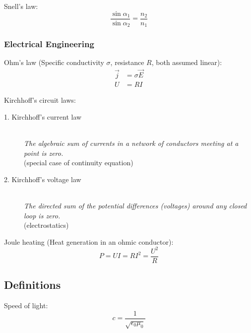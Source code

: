 			\noindent
			Snell's law:
			\begin{equation}
				\frac{\sin\alpha_1}{\sin\alpha_2} = \frac{n_2}{n_1}
			\end{equation}



		\subsubsection{Electrical Engineering}
			\noindent
			Ohm's law (Specific conductivity $\sigma$, resistance $R$, both assumed linear):
			\begin{equation}
				\begin{aligned}
					\vec{j} &= \sigma\vec{E} \\
					U &= R I
				\end{aligned}
			\end{equation}

			\noindent
			Kirchhoff's circuit laws:
			\begin{description}
				\item[1. Kirchhoff's current law] \hfill \\
					{\textit{The algebraic sum of currents in a network of conductors meeting at a point is zero.} \\(special case of continuity equation)}
				\item[2. Kirchhoff's voltage law] \hfill \\
					{\textit{The directed sum of the potential differences (voltages) around any closed loop is zero.} \\(electrostatics)}
			\end{description}

			\noindent
			Joule heating (Heat generation in an ohmic conductor):
			\begin{equation}
				P = UI = RI^2 = \frac{U^2}{R}
			\end{equation}



	\subsection{Definitions}
		\noindent
		Speed of light:
		\begin{equation}
			c=\frac{1}{\sqrt{\epsilon_0 \mu_0}}
		\end{equation}

